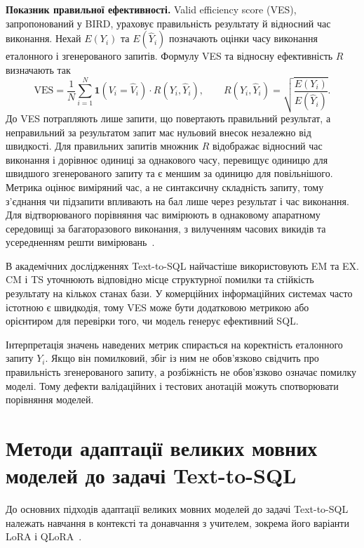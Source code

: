 \documentclass[a4paper,14pt,oneside]{extreport}
\begin{document}
\textbf{Показник правильної ефективності.}
Valid efficiency score (VES), запропонований у BIRD, ураховує правильність результату й відносний час виконання. Нехай \(E(Y_i)\) та \(E(\hat Y_i)\) позначають оцінки часу виконання еталонного і згенерованого запитів. Формулу VES та відносну ефективність \(R\) визначають так~\cite{li2023bird}
\begin{equation}
\label{eq:ves}
\mathrm{VES}
=\frac{1}{N}\sum_{i=1}^{N}
\mathbf{1}(V_i=\hat V_i)
\cdot R(Y_i,\hat Y_i),
\qquad
R(Y_i,\hat Y_i)
=\sqrt{\frac{E(Y_i)}{E(\hat Y_i)}}.
\end{equation}
До VES потрапляють лише запити, що повертають правильний результат, а неправильний за результатом запит має нульовий внесок незалежно від швидкості. Для правильних запитів множник \(R\) відображає відносний час виконання і дорівнює одиниці за однакового часу, перевищує одиницю для швидшого згенерованого запиту та є меншим за одиницю для повільнішого. Метрика оцінює виміряний час, а не синтаксичну складність запиту, тому з’єднання чи підзапити впливають на бал лише через результат і час виконання. Для відтворюваного порівняння час вимірюють в однаковому апаратному середовищі за багаторазового виконання, з вилученням часових викидів та усередненням решти вимірювань~\cite{li2023bird}.

В академічних дослідженнях Text-to-SQL найчастіше використовують EM та EX. CM і TS уточнюють відповідно місце структурної помилки та стійкість результату на кількох станах бази. У комерційних інформаційних системах часто істотною є швидкодія, тому VES може бути додатковою метрикою або орієнтиром для перевірки того, чи модель генерує ефективний SQL.

Інтерпретація значень наведених метрик спирається на коректність еталонного запиту \(Y_i\). Якщо він помилковий, збіг із ним не обов’язково свідчить про правильність згенерованого запиту, а розбіжність не обов’язково означає помилку моделі. Тому дефекти валідаційних і тестових анотацій можуть спотворювати порівняння моделей.

\section{Методи адаптації великих мовних моделей до задачі Text-to-SQL}

До основних підходів адаптації великих мовних моделей до задачі Text-to-SQL належать навчання в контексті та донавчання з учителем, зокрема його варіанти LoRA і QLoRA~\cite{hong2025nextgeneration,shi2025survey,gao2024benchmark}.
\end{document}

